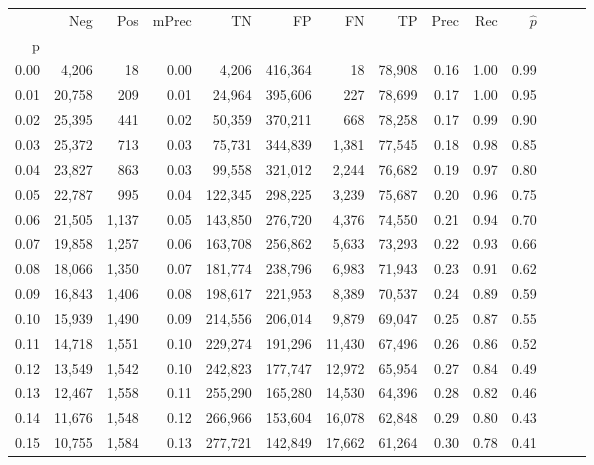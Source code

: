 \begin{tabular}{rrrrrrrrrrrrrr}
\toprule
{} &     Neg &    Pos & mPrec &       TN &       FP &      FN &      TP &  Prec &   Rec & $\hat{p}$ \\
p    &         &        &       &          &          &         &         &       &       &           \\
\midrule
0.00 &   4,206 &     18 &  0.00 &    4,206 &  416,364 &      18 &  78,908 &  0.16 &  1.00 &      0.99 \\
0.01 &  20,758 &    209 &  0.01 &   24,964 &  395,606 &     227 &  78,699 &  0.17 &  1.00 &      0.95 \\
0.02 &  25,395 &    441 &  0.02 &   50,359 &  370,211 &     668 &  78,258 &  0.17 &  0.99 &      0.90 \\
0.03 &  25,372 &    713 &  0.03 &   75,731 &  344,839 &   1,381 &  77,545 &  0.18 &  0.98 &      0.85 \\
0.04 &  23,827 &    863 &  0.03 &   99,558 &  321,012 &   2,244 &  76,682 &  0.19 &  0.97 &      0.80 \\
0.05 &  22,787 &    995 &  0.04 &  122,345 &  298,225 &   3,239 &  75,687 &  0.20 &  0.96 &      0.75 \\
0.06 &  21,505 &  1,137 &  0.05 &  143,850 &  276,720 &   4,376 &  74,550 &  0.21 &  0.94 &      0.70 \\
0.07 &  19,858 &  1,257 &  0.06 &  163,708 &  256,862 &   5,633 &  73,293 &  0.22 &  0.93 &      0.66 \\
0.08 &  18,066 &  1,350 &  0.07 &  181,774 &  238,796 &   6,983 &  71,943 &  0.23 &  0.91 &      0.62 \\
0.09 &  16,843 &  1,406 &  0.08 &  198,617 &  221,953 &   8,389 &  70,537 &  0.24 &  0.89 &      0.59 \\
0.10 &  15,939 &  1,490 &  0.09 &  214,556 &  206,014 &   9,879 &  69,047 &  0.25 &  0.87 &      0.55 \\
0.11 &  14,718 &  1,551 &  0.10 &  229,274 &  191,296 &  11,430 &  67,496 &  0.26 &  0.86 &      0.52 \\
0.12 &  13,549 &  1,542 &  0.10 &  242,823 &  177,747 &  12,972 &  65,954 &  0.27 &  0.84 &      0.49 \\
0.13 &  12,467 &  1,558 &  0.11 &  255,290 &  165,280 &  14,530 &  64,396 &  0.28 &  0.82 &      0.46 \\
0.14 &  11,676 &  1,548 &  0.12 &  266,966 &  153,604 &  16,078 &  62,848 &  0.29 &  0.80 &      0.43 \\
0.15 &  10,755 &  1,584 &  0.13 &  277,721 &  142,849 &  17,662 &  61,264 &  0.30 &  0.78 &      0.41 \\

\end{tabular}
